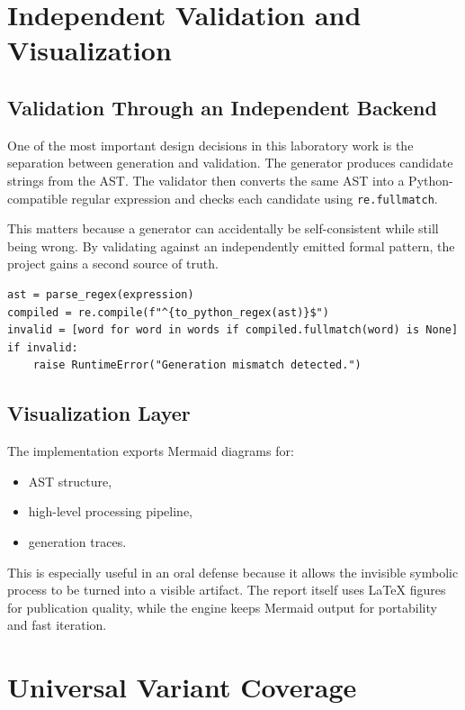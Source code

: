 \documentclass[a4paper,12pt]{article}
\begin{document}
\section{Independent Validation and Visualization}

\subsection{Validation Through an Independent Backend}

One of the most important design decisions in this laboratory work is the separation between generation and validation. The generator produces candidate strings from the AST. The validator then converts the same AST into a Python-compatible regular expression and checks each candidate using \texttt{re.fullmatch}.

This matters because a generator can accidentally be self-consistent while still being wrong. By validating against an independently emitted formal pattern, the project gains a second source of truth.

\begin{lstlisting}[style=labpython,caption={Validation strategy for generated words.}]
ast = parse_regex(expression)
compiled = re.compile(f"^{to_python_regex(ast)}$")
invalid = [word for word in words if compiled.fullmatch(word) is None]
if invalid:
    raise RuntimeError("Generation mismatch detected.")
\end{lstlisting}

\subsection{Visualization Layer}

The implementation exports Mermaid diagrams for:

\begin{itemize}
    \item AST structure,
    \item high-level processing pipeline,
    \item generation traces.
\end{itemize}

This is especially useful in an oral defense because it allows the invisible symbolic process to be turned into a visible artifact. The report itself uses \LaTeX{} figures for publication quality, while the engine keeps Mermaid output for portability and fast iteration.

\section{Universal Variant Coverage}
\end{document}
